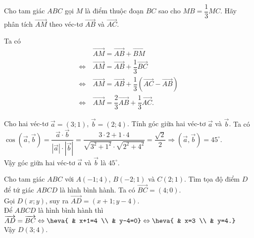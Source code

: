 \begin{bt}%
Cho tam giác $ABC$ gọi $M$ là điểm thuộc đoạn $BC$ sao cho $MB=\dfrac{1}{3}MC$. Hãy phân tích $\overrightarrow{AM}$ theo véc-tơ $\overrightarrow{AB}$ và $\overrightarrow{AC}$.
\loigiai
{
\immini
{
Ta có
$$\begin{aligned}
& \ \overrightarrow{AM}=\overrightarrow{AB}+\overrightarrow{BM} \\
\Leftrightarrow & \ \overrightarrow{AM}=\overrightarrow{AB}+\dfrac{1}{3}\overrightarrow{BC} \\
\Leftrightarrow & \ \overrightarrow{AM}=\overrightarrow{AB}+\dfrac{1}{3}\left(\overrightarrow{AC}-\overrightarrow{AB}\right) \\
\Leftrightarrow & \ \overrightarrow{AM}=\dfrac{2}{3}\overrightarrow{AB}+\dfrac{1}{3}\overrightarrow{AC}.
\end{aligned}$$
}
{
}
}
\end{bt}

\begin{bt}%
Cho hai véc-tơ $\overrightarrow{a}=(3;1)$, $\overrightarrow{b}=(2;4)$. Tính góc giữa hai véc-tơ $\overrightarrow{a}$ và $\overrightarrow{b}$.
\loigiai
{
Ta có $\cos \left(\overrightarrow{a},\overrightarrow{b}\right)=\dfrac{\overrightarrow{a}\cdot\overrightarrow{b}}{\left|\overrightarrow{a}\right|\cdot\left|\overrightarrow{b}\right|}=\dfrac{3\cdot2+1\cdot4}{\sqrt{3^2+1^2}\cdot\sqrt{2^2+4^2}}=\dfrac {\sqrt 2}{2} \Rightarrow \left(\overrightarrow{a},\overrightarrow{b}\right)=45^{\circ}$. \\
Vậy góc giữa hai véc-tơ $\overrightarrow{a}$ và $\overrightarrow{b}$ là $45^{\circ}$.
}
\end{bt}

\begin{bt}%
Cho tam giác $ABC$ với $A(-1;4)$, $B(-2;1)$ và $C(2;1)$. Tìm tọa độ điểm $D$ để tứ giác $ABCD$ là hình bình hành.
\loigiai
{
Ta có $\overrightarrow{BC}=(4;0)$. \\
Gọi $D(x;y)$, suy ra $\overrightarrow{AD}=(x+1;y-4)$. \\
Để $ABCD$ là hình bình hành thì $\overrightarrow{AD}=\overrightarrow{BC} \Leftrightarrow \heva{ & x+1=4 \\ & y-4=0} \Leftrightarrow \heva{ & x=3 \\ & y=4.}$ \\
Vậy $D(3;4)$.
}
\end{bt}

